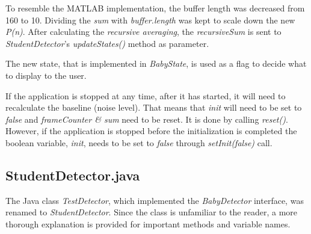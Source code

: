 To resemble the MATLAB implementation, the buffer length was decreased from 160
to 10. Dividing the \emph{sum} with \emph{buffer.length} was kept to scale down 
the new \emph{P(n)}. After calculating the \emph{recursive averaging}, the 
\emph{recursiveSum} is sent to \emph{StudentDetector}'s \emph{updateStates()} 
method as parameter.


The new state, that is implemented in \emph{BabyState}, is used as a flag to 
decide what to display to the user. 



If the application is stopped at any time, after it has started, it will need to
recalculate the baseline (noise level). That means that \emph{init} will need to
be set to \emph{false} and \emph{frameCounter \& sum} need to be reset. It is 
done by calling \emph{reset()}. However, if the application is stopped before
the initialization is completed the boolean variable, \emph{init}, needs to be 
set to \emph{false} through \emph{setInit(false)} call. 




\subsection{StudentDetector.java}
The Java class \emph{TestDetector}, which implemented the \emph{BabyDetector}
interface, was renamed to \emph{StudentDetector}. Since the class is unfamiliar
to the reader, a more thorough explanation is provided for important methods and
variable names.

